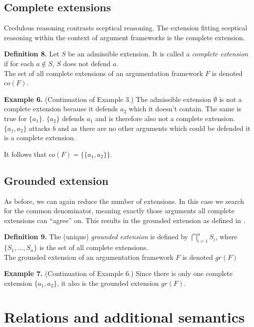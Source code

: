 \documentclass[draft,final]{vutinfth} %
\newcommand{\hl}{\par\vspace{6pt}} %
\newcommand{\cl}{\par\vspace{12pt}} %
\begin{document}
\section{Complete extensions}

Credulous reasoning contrasts sceptical reasoning. The extension fitting sceptical reasoning within the context of argument frameworks is the complete extension.\cl

\textbf{Definition 8.} Let $S$ be an admissible extension. It is called a \emph{complete extension} if for each $a\not\in S$, $S$ does not defend $a$.\\
The set of all complete extensions of an argumentation framework $F$ is denoted $co(F)$.\cl

\textbf{Example 6.} (Continuation of Example 3.) The admissible extension $\emptyset$ is not a complete extension because it defends $a_2$ which it doesn't contain. The same is true for $\{a_1\}$. $\{a_2\}$ defends $a_1$ and is therefore also not a complete extension.\\
$\{a_1,a_2\}$ attacks $b$ and as there are no other arguments which could be defended it is a complete extension.\hl
It follows that $co(F)=\{\{a_1,a_2\}\}$.\cl

\section{Grounded extension}

As before, we can again reduce the number of extensions. In this case we search for the common denominator, meaning exactly those arguments all complete extensions can ``agree'' on. This results in the grounded extension as defined in \cite{Egly}.\cl

\textbf{Definition 9.} The (unique) \emph{grounded extension} is defined by $\bigcap\limits_{i=1}^n{S_i}$, where $\{S_1,...,S_n\}$ is the set of all complete extensions.\\
The grounded extension of an argumentation framework $F$ is denoted $gr(F)$\cl

\textbf{Example 7.} (Continuation of Example 6.) Since there is only one complete extension $\{a_1,a_2\}$, it also is the grounded extension $gr(F)$.\cl

\chapter{Relations and additional semantics} %
\end{document}

